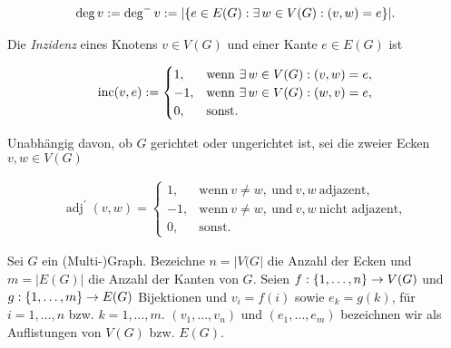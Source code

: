 \begin{definition}
    \begin{align*}
        \deg v
        :=
        \deg^- v
        :=
        |{\left \{ e \in E(G): \exists \, w \in V(G): (v, w) = e \right \}}|.
    \end{align*}

    Die \textit{Inzidenz} eines Knotens $v \in V(G)$ und einer Kante $e \in E(G)$ ist

    \begin{align*}
        \operatorname{inc}(v, e)
        :=
        \begin{cases}
             1, & \text{wenn}~ \exists \, w \in V(G): (v, w) = e, \\
            -1, & \text{wenn}~ \exists \, w \in V(G): (w, v) = e, \\
             0, & \text{sonst}.
        \end{cases}
    \end{align*}

    Unabhängig davon, ob $G$ gerichtet oder ungerichtet ist, sei die  zweier Ecken $v, w \in V(G)$

    \begin{align*}
        \operatorname{adj}^\prime(v, w)
        =
        \begin{cases}
             1, & \text{wenn}~ v \neq w, ~\text{und}~ v, w ~\text{adjazent}, \\
            -1, & \text{wenn}~ v \neq w, ~\text{und}~ v, w ~\text{nicht adjazent}, \\
             0, & \text{sonst}.
        \end{cases}
    \end{align*}

\end{definition}

\begin{definition} \label{def:listing}

    Sei $G$ ein (Multi-)Graph.
    Bezeichne $n = |V(G|$ die Anzahl der Ecken und $m = |E(G)|$ die Anzahl der Kanten von $G$.
    Seien $f: {\left \{ 1, \dots, n \right \}} \to V(G)$ und $g: {\left \{ 1, \dots, m \right \}} \to E(G)$ Bijektionen und $v_i = f(i)$ sowie $e_k = g(k)$, für $i = 1, \dots, n$ bzw. $k = 1, \dots, m$.
    $(v_1, \dots, v_n)$ und $(e_1, \dots, e_m)$ bezeichnen wir als Auflistungen von $V(G)$ bzw. $E(G)$.

\end{definition}

